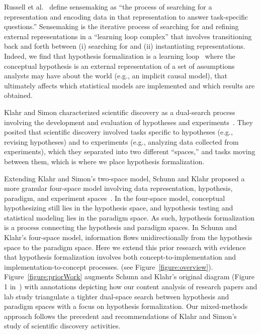 Russell et al.~\cite{russell1993cost} define sensemaking as ``the process of
searching for a representation and encoding data in that representation to
answer task-specific questions.'' Sensemaking is the iterative process of
searching for and refining external representations in a ``learning loop
complex'' that involves transitioning back and forth between (i) searching for
and (ii) instantiating representations.
Indeed, we find that hypothesis formalization is a learning
loop~\cite{russell1993cost} where the conceptual hypothesis is an external
representation of a set of assumptions analysts may have about the world (e.g.,
an implicit causal model), that ultimately affects which statistical models are
implemented and which results are obtained. 

Klahr and Simon characterized scientific discovery as a dual-search process
involving the development and evaluation of hypotheses and
experiments~\cite{klahr1988dual}. They posited that scientific
discovery involved tasks specific to hypotheses (e.g., revising hypotheses) and
to experiments (e.g., analyzing data collected from experiments), which they
separated into two different ``spaces,'' and tasks moving between them, which is
where we place hypothesis formalization.

Extending Klahr and Simon's two-space model, Schunn and Klahr proposed a more
granular four-space model involving data representation, hypothesis, paradigm,
and experiment spaces~\cite{schunn1995FourSpace,schunn1996BeyondTwoSpace}. In the four-space model, conceptual hypothesizing still lies in the
hypothesis space, and hypothesis testing and statistical modeling lies in the
paradigm space. As such, hypothesis formalization is a process connecting
the hypothesis and paradigm spaces. In Schunn and Klahr's four-space model,
information flows unidirectionally from the hypothesis space to the paradigm space.
Here we extend this prior research with
evidence that hypothesis formalization involves both
concept-to-implementation and implementation-to-concept processes. (see
Figure~\ref{figure:overview}).
Figure~\ref{figure:priorWork} augments Schunn and Klahr's
original diagram (Figure 1 in~\cite{schunn1995FourSpace}) with
annotations depicting how our content analysis of research papers and lab study
triangulate a tighter dual-space search between hypothesis and
paradigm spaces with a focus on hypothesis formalization. Our mixed-methods
approach follows the precedent and recommendations of Klahr and
Simon's~\cite{klahr1999studies} study of scientific discovery activities.

